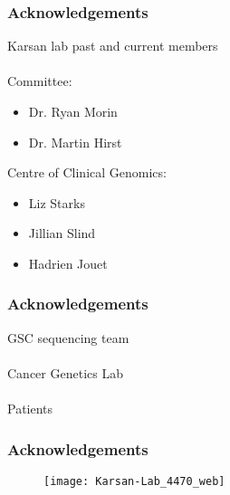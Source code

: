 \documentclass{beamer}
\begin{document}
\begin{frame}
\frametitle{Acknowledgements}
Karsan lab past and current members
\\~\\

Committee:
\begin{itemize}
  \item Dr. Ryan Morin
  \item Dr. Martin Hirst
\end{itemize}

Centre of Clinical Genomics:
\begin{itemize}
  \item Liz Starks
  \item Jillian Slind
  \item Hadrien Jouet
\end{itemize}
\end{frame}

\begin{frame}
\frametitle{Acknowledgements}
GSC sequencing team
\\~\\
Cancer Genetics Lab
\\~\\
Patients
\end{frame}

\begin{frame}
\frametitle{Acknowledgements}
\begin{figure}[t]
    \texttt{[image: Karsan-Lab\_4470\_web]}
\end{figure}
\end{frame}
\end{document}
